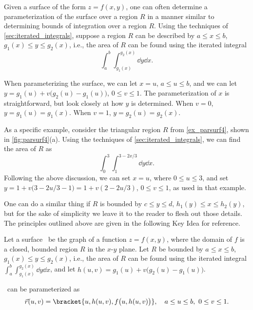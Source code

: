 Given a surface of the form $z=f(x,y)$, one can often determine a parameterization of the surface over a region $R$ in a manner similar to determining bounds of integration over a region $R$. Using the techniques of \autoref{sec:iterated_integrals}, suppose a region $R$ can be described by $a\leq x\leq b$, $g_1(x) \leq y\leq g_2(x)$, i.e., the area of $R$ can be found using the iterated integral
\[\int_a^b\int_{g_1(x)}^{g_2(x)}\dd y\dd x.\]

When parameterizing the surface, we can let $x=u$, $a\leq u\leq b$, and we can let $y = g_1(u)+v\bigl(g_2(u)-g_1(u)\bigr)$, $0\leq v\leq 1$. The parameterization of $x$ is straightforward, but look closely at how $y$ is determined. When $v=0$, $y=g_1(u) = g_1(x)$. When $v=1$, $y= g_2(u)=g_2(x)$. 

As a specific example, consider the triangular region $R$ from \autoref{ex_parsurf4}, shown in \autoref{fig:parsurf4}(a). Using the techniques of \autoref{sec:iterated_integrals}, we can find the area of $R$ as
\[\int_0^3\int_1^{3-2x/3}\dd y\dd x.\]
Following the above discussion, we can set $x=u$, where $0\leq u\leq 3$, and set $y = 1+ v\bigl(3-2u/3-1\bigr) = 1+v(2-2u/3)$, $0\leq v\leq 1$, as used in that example.

One can do a similar thing if $R$ is bounded by $c\leq y\leq d$, $h_1(y)\leq x\leq h_2(y)$, but for the sake of simplicity we leave it to the reader to flesh out those details. The principles outlined above are given in the following Key Idea for reference.

\begin{keyidea}\label{idea:parameterizing_surfaces}
Let a surface \surfaceS\ be the graph of a function $z=f(x,y)$, where the domain of $f$ is  a closed, bounded region $R$ in the $x$-$y$ plane. 
Let $R$ be bounded by $a\leq x\leq b$, $g_1(x)\leq y\leq g_2(x)$, i.e., the area of $R$ can be found using the iterated integral $\int_a^b\int_{g_1(x)}^{g_2(x)}\dd y\dd x$, and let $h(u,v) = g_1(u)+v\bigl(g_2(u)-g_1(u)\bigr)$. 

\surfaceS\ can be parameterized as 
\[
\vec r(u,v)
= \bracket{u, h(u,v), f\bigl(u,h(u,v)\bigr)},\quad a\leq u\leq b,\ 0\leq v\leq 1.
\]
\end{keyidea}


